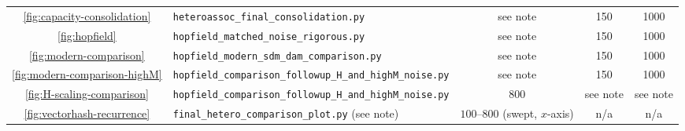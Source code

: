 \documentclass[11pt]{article}
\newcommand{\bottomrule}{\hline\hline}
\begin{document}
\begin{center}
\begin{tabular}{clccc}
\ref{fig:capacity-consolidation} & \texttt{heteroassoc\_final\_consolidation.py} & see note & 150 & 1000 \\
\ref{fig:hopfield} & \texttt{hopfield\_matched\_noise\_rigorous.py} & see note & 150 & 1000 \\
\ref{fig:modern-comparison} & \texttt{hopfield\_modern\_sdm\_dam\_comparison.py} & see note & 150 & 1000 \\
\ref{fig:modern-comparison-highM} & \texttt{hopfield\_comparison\_followup\_H\_and\_highM\_noise.py} & see note & 150 & 1000 \\
\ref{fig:H-scaling-comparison} & \texttt{hopfield\_comparison\_followup\_H\_and\_highM\_noise.py} & 800 & see note & see note \\
\ref{fig:vectorhash-recurrence} & \texttt{final\_hetero\_comparison\_plot.py} (see note) & $100$--$800$ (swept, $x$-axis) & n/a & n/a \\
\bottomrule
\end{tabular}
\end{center}
\end{document}
